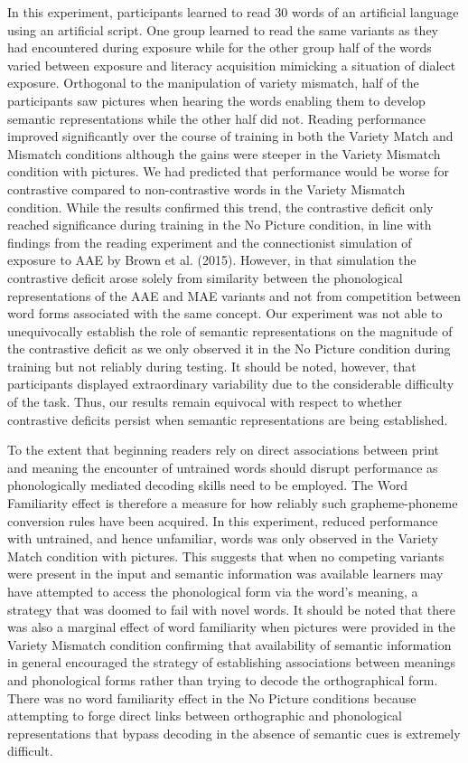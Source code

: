 \documentclass[doc,floatsintext]{apa6}
\begin{document}
In this experiment, participants learned to read 30 words of an
artificial language using an artificial script. One group learned to
read the same variants as they had encountered during exposure while for
the other group half of the words varied between exposure and literacy
acquisition mimicking a situation of dialect exposure. Orthogonal to the
manipulation of variety mismatch, half of the participants saw pictures
when hearing the words enabling them to develop semantic representations
while the other half did not. Reading performance improved significantly
over the course of training in both the Variety Match and Mismatch
conditions although the gains were steeper in the Variety Mismatch
condition with pictures. We had predicted that performance would be
worse for contrastive compared to non-contrastive words in the Variety
Mismatch condition. While the results confirmed this trend, the
contrastive deficit only reached significance during training in the No
Picture condition, in line with findings from the reading experiment and
the connectionist simulation of exposure to AAE by Brown et al. (2015).
However, in that simulation the contrastive deficit arose solely from
similarity between the phonological representations of the AAE and MAE
variants and not from competition between word forms associated with the
same concept. Our experiment was not able to unequivocally establish the
role of semantic representations on the magnitude of the contrastive
deficit as we only observed it in the No Picture condition during
training but not reliably during testing. It should be noted, however,
that participants displayed extraordinary variability due to the
considerable difficulty of the task. Thus, our results remain equivocal
with respect to whether contrastive deficits persist when semantic
representations are being established.

To the extent that beginning readers rely on direct associations between
print and meaning the encounter of untrained words should disrupt
performance as phonologically mediated decoding skills need to be
employed. The Word Familiarity effect is therefore a measure for how
reliably such grapheme-phoneme conversion rules have been acquired. In
this experiment, reduced performance with untrained, and hence
unfamiliar, words was only observed in the Variety Match condition with
pictures. This suggests that when no competing variants were present in
the input and semantic information was available learners may have
attempted to access the phonological form via the word's meaning, a
strategy that was doomed to fail with novel words. It should be noted
that there was also a marginal effect of word familiarity when pictures
were provided in the Variety Mismatch condition confirming that
availability of semantic information in general encouraged the strategy
of establishing associations between meanings and phonological forms
rather than trying to decode the orthographical form. There was no word
familiarity effect in the No Picture conditions because attempting to
forge direct links between orthographic and phonological representations
that bypass decoding in the absence of semantic cues is extremely
difficult.
\end{document}
